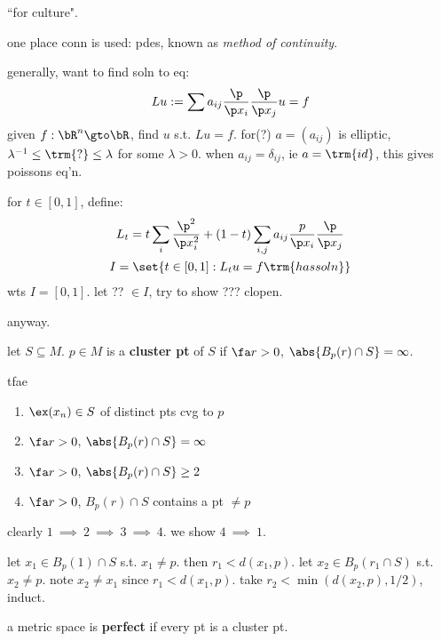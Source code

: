 ``for culture".

one place conn is used: pdes, known as \textit{method of continuity}.

generally, want to find soln to eq:
\begin{equation*}
    Lu:=\sum a_{ij}\frac{\p}{\p x_{i}}\frac{\p}{\p x_{j}}u = f
\end{equation*}
given $f:\bR^{n}\gto\bR$, find $u$ s.t. $Lu=f$.
for(?) $a=(a_{ij})$ is elliptic, $\lambda^{-1}\leq \trm{?}\leq\lambda$
for some $\lambda>0$.
when $a_{ij}=\delta_{ij}$, ie $a=\trm{id}$, this gives poissons eq'n.

for $t\in[0,1]$, define:
\begin{gather*}
    L_{t}=t\sum	_{i}\frac{\p^{2}}{\p x_{i}^{2}}
	+(1-t)\sum_{i,j}a_{ij}\frac{p}{\p x_{i}}\frac{\p}{\p x_{j}} \\
	I=\set{t\in[0,1]:L_{t}u=f \trm{ has soln}}
\end{gather*}
wts $I=[0,1]$. let ?? $\in I$, try to show ??? clopen.

anyway.

\begin{defn}
    let $S\subseteq M$. $p\in M$ is a \textbf{cluster pt} of $S$ if
	$\fa r>0$, $\abs{B_{p}(r)\cap S}=\infty$.
\end{defn}

\begin{thm}
    tfae
	\begin{enumerate}
	    \item $\ex(x_{n})\in S$ of distinct pts cvg to $p$
		\item $\fa r>0$, $\abs{B_{p}(r)\cap S}=\infty$
		\item $\fa r>0$, $\abs{B_{p}(r)\cap S}\geq2$
		\item $\fa r>0$, $B_{p}(r)\cap S$ contains a pt $\neq p$
	\end{enumerate}
\end{thm}

\begin{pf}[source=Primary Source Material]
    clearly $1 \ \implies \ 2 \ \implies \ 3 \ \implies \ 4$.
	we show $4 \ \implies \ 1$.

	let $x_{1}\in B_{p}(1)\cap S$ s.t. $x_{1}\neq p$.
	then $r_{1}<d(x_{1},p)$.
	let $x_{2}\in B_{p}(r_{1}\cap S)$ s.t. $x_{2}\neq p$.
	note $x_{2}\neq x_{1}$ since $r_{1}<d(x_{1},p)$.
	take $r_{2}<\min(d(x_{2},p),1/2)$, induct.
\end{pf}

\begin{defn}
    a metric space is \textbf{perfect} if every pt is a cluster pt.
\end{defn}

